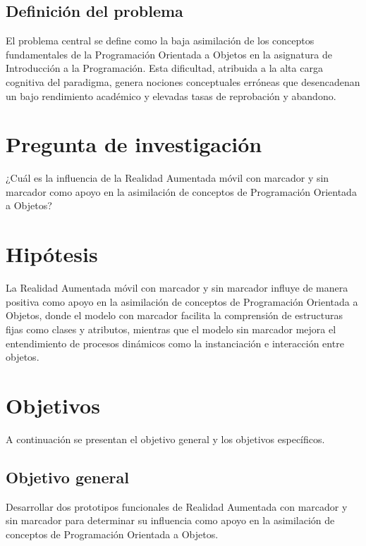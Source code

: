 \subsection{Definición del problema}
El problema central se define como la baja asimilación de los conceptos 
fundamentales de la Programación Orientada a Objetos en la asignatura de 
Introducción a la Programación. Esta dificultad, atribuida a la alta carga 
cognitiva del paradigma, genera nociones conceptuales erróneas que 
desencadenan un bajo rendimiento académico y elevadas tasas de reprobación y 
abandono.

\section{Pregunta de investigación}
¿Cuál es la influencia de la Realidad Aumentada móvil con marcador y sin 
marcador como apoyo en la asimilación de conceptos de Programación Orientada 
a Objetos?

\section{Hipótesis}
La Realidad Aumentada móvil con marcador y sin marcador influye de manera 
positiva como apoyo en la asimilación de conceptos de Programación Orientada 
a Objetos, donde el modelo con marcador facilita la comprensión de estructuras 
fijas como clases y atributos, mientras que el modelo sin marcador mejora el 
entendimiento de procesos dinámicos como la instanciación e interacción entre 
objetos.

\section{Objetivos}
A continuación se presentan el objetivo general y los objetivos específicos.

\subsection{Objetivo general}
Desarrollar dos prototipos funcionales de Realidad Aumentada con marcador y 
sin marcador para determinar su influencia como apoyo en la asimilación de 
conceptos de Programación Orientada a Objetos.


